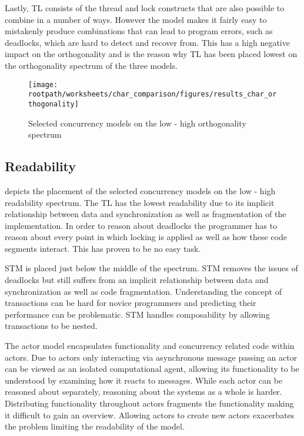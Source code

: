 Lastly, \ac{TL} consists of the thread and lock constructs that are also possible to combine in a number of ways. However the model makes it fairly easy to mistakenly produce combinations that can lead to program errors, such as deadlocks, which are hard to detect and recover from. This has a high negative impact on the orthogonality and is the reason why \ac{TL} has been placed lowest on the orthogonality spectrum of the three models.

\begin{figure}[htbp]
\centering
 \texttt{[image: \\rootpath/worksheets/char\_comparison/figures/results\_char\_orthogonality]} 
 \caption{Selected concurrency models on the low - high orthogonality spectrum}
\label{fig:results_char_orthogonality}
\end{figure}

\subsection{Readability}\label{sec:result_char_readability}
 depicts the placement of the selected concurrency models on the low - high readability spectrum. The \ac{TL} has the lowest readability due to its implicit relationship between data and synchronization as well as fragmentation of the implementation. In order to reason about deadlocks the programmer has to reason about every point in which locking is applied as well as how these code segments interact. This has proven to be no easy task.

\ac{STM} is placed just below the middle of the spectrum. \ac{STM} removes the issues of deadlocks but still suffers from an implicit relationship between data and synchronization as well as code fragmentation. Understanding the concept of transactions can be hard for novice programmers and predicting their performance can be problematic. \ac{STM} handles composability by allowing transactions to be nested. 

The actor model encapsulates functionality and concurrency related code within actors. Due to actors only interacting via asynchronous message passing an actor can be viewed as an isolated computational agent, allowing its functionality to be understood by examining how it reacts to messages. While each actor can be reasoned about separately, reasoning about the systems as a whole is harder. Distributing functionality throughout actors fragments the functionality making it difficult to gain an overview. Allowing actors to create new actors exacerbates the problem limiting the readability of the model.

